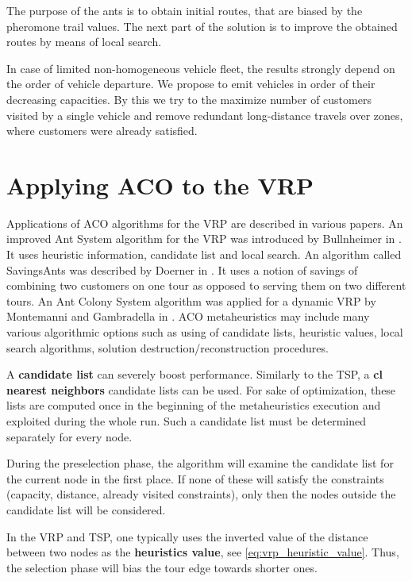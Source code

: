\documentclass[11pt,a4paper,oneside]{book}
\begin{document}
The purpose of the ants is to obtain initial routes, that are biased by the pheromone trail values. The next part of the solution is to improve the obtained routes by means of local search.

In case of limited non-homogeneous vehicle fleet, the results strongly depend on the order of vehicle departure. We propose to emit vehicles in order of their decreasing capacities. By this we try to the maximize number of customers visited by a single vehicle and remove redundant long-distance travels over zones, where customers were already satisfied.

\section{Applying ACO to the VRP}

Applications of ACO algorithms for the VRP are described in various papers. An improved Ant System algorithm for the VRP was introduced by Bullnheimer in \cite{DBLP:journals/anor/BullnheimerHS99}. It uses heuristic information, candidate list and local search. An algorithm called SavingsAnts was described by Doerner in \cite{10.1007/3-540-46004-7_2}. It uses a notion of savings of combining two customers on one tour as opposed to serving them on two different tours. An Ant Colony System algorithm was applied for a dynamic VRP by Montemanni and Gambradella in \cite{MontemanniR.2005ACSf}. ACO metaheuristics may include many various algorithmic options such as using of candidate lists, heuristic values, local search algorithms, solution destruction/reconstruction procedures.

A \textbf{candidate list} can severely boost performance. Similarly to the TSP, a \textbf{cl nearest neighbors} candidate lists can be used. For sake of optimization, these lists are computed once in the beginning of the metaheuristics execution and exploited during the whole run. Such a candidate list must be determined separately for every node.

During the preselection phase, the algorithm will examine the candidate list for the current node in the first place. If none of these will satisfy the constraints (capacity, distance, already visited constraints), only then the nodes outside the candidate list will be considered.

In the VRP and TSP, one typically uses the inverted value of the distance between two nodes as the \textbf{heuristics value}, see \eqref{eq:vrp_heuristic_value}. Thus, the selection phase will bias the tour edge towards shorter ones.
\end{document}
